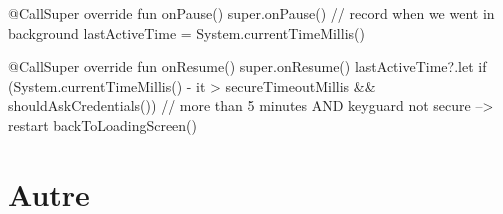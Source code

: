 \begin{kotlincode}
@CallSuper
override fun onPause() {
    super.onPause()
    // record when we went in background
    lastActiveTime = System.currentTimeMillis()
}

@CallSuper
override fun onResume() {
    super.onResume()
    lastActiveTime?.let {
        if (System.currentTimeMillis() - it > secureTimeoutMillis && 
                shouldAskCredentials()){
            // more than 5 minutes AND keyguard not secure --> restart
            backToLoadingScreen()
        }
    }  
}
\end{kotlincode}

\section{Autre}







